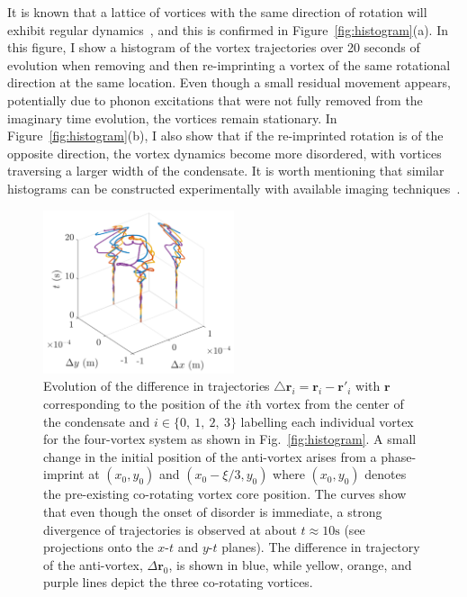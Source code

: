 It is known that a lattice of vortices with the same direction of rotation will exhibit regular dynamics~\cite{abo2001}, and this is confirmed in Figure~\ref{fig:histogram}(a).
In this figure, I show a histogram of the vortex trajectories over 20 seconds of evolution when removing and then re-imprinting a vortex of the same rotational direction at the same location.
Even though a small residual movement appears, potentially due to phonon excitations that were not fully removed from the imaginary time evolution, the vortices remain stationary.
In Figure~\ref{fig:histogram}(b), I also show that if the re-imprinted rotation is of the opposite direction, the vortex dynamics become more disordered, with vortices traversing a larger width of the condensate.
It is worth mentioning that similar histograms can be constructed experimentally with available imaging techniques~\cite{wilson2015,freilich2010}.

\begin{figure}
\center \includegraphics[width=0.5\textwidth]{data/2d/evolution/evolution}

\caption{
Evolution of the difference in trajectories $\triangle \textbf{r}_i = \textbf{r}_{i}-\textbf{r}'_{i}$ with $\textbf{r}$ corresponding to the position of the $i$th vortex from the center of the condensate and $i\in \{0,\ 1,\ 2,\ 3\}$ labelling each individual vortex for the four-vortex system as shown in Fig.~\ref{fig:histogram}.
A small change in the initial position of the anti-vortex arises from a phase-imprint at $(x_{0},y_{0})$ and $(x_{0}-\xi/3,y_{0})$ where $(x_{0},y_{0})$ denotes the pre-existing co-rotating vortex core position.
The curves show that even though the onset of disorder is immediate, a strong divergence of trajectories is observed at about $t\approx 10 \text{s}$ (see projections onto the $x$-$t$ and $y$-$t$ planes).
The difference in trajectory of the anti-vortex, $\Delta \mathbf{r}_0$, is shown in blue, while yellow, orange, and purple lines depict the three co-rotating vortices.
}
\label{fig:evolution}
\end{figure}

